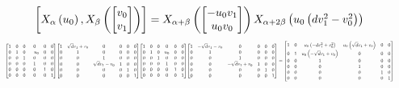 \documentclass[11pt]{article}
\theoremstyle{definition}
\begin{document}
\[
\scaletoalign{\textwidth}{\left[ X_{\alpha}\left(u_{0}\right), X_{\beta}\left(\left[\begin{matrix}v_{0}\\v_{1}\end{matrix}\right]\right) \right] = X_{\alpha + \beta}\left(\left[\begin{matrix}- u_{0} v_{1}\\u_{0} v_{0}\end{matrix}\right]\right) X_{\alpha + 2\beta}\left(u_{0} \left(d v_{1}^{2} - v_{0}^{2}\right)\right)}
\]
\[
\scaletoalign{\textwidth}{{\left[\begin{matrix}1 & 0 & 0 & 0 & 0 & 0\\0 & 1 & 0 & - u_{0} & 0 & 0\\0 & 0 & 1 & 0 & 0 & 0\\0 & 0 & 0 & 1 & 0 & 0\\0 & 0 & 0 & 0 & 1 & 0\\0 & 0 & 0 & 0 & 0 & 1\end{matrix}\right]} {\left[\begin{matrix}1 & \sqrt{d} v_{1} + v_{0} & 0 & 0 & 0 & 0\\0 & 1 & 0 & 0 & 0 & 0\\0 & 0 & 1 & 0 & 0 & 0\\0 & 0 & \sqrt{d} v_{1} - v_{0} & 1 & 0 & 0\\0 & 0 & 0 & 0 & 1 & 0\\0 & 0 & 0 & 0 & 0 & 1\end{matrix}\right]} {\left[\begin{matrix}1 & 0 & 0 & 0 & 0 & 0\\0 & 1 & 0 & u_{0} & 0 & 0\\0 & 0 & 1 & 0 & 0 & 0\\0 & 0 & 0 & 1 & 0 & 0\\0 & 0 & 0 & 0 & 1 & 0\\0 & 0 & 0 & 0 & 0 & 1\end{matrix}\right]} {\left[\begin{matrix}1 & - \sqrt{d} v_{1} - v_{0} & 0 & 0 & 0 & 0\\0 & 1 & 0 & 0 & 0 & 0\\0 & 0 & 1 & 0 & 0 & 0\\0 & 0 & - \sqrt{d} v_{1} + v_{0} & 1 & 0 & 0\\0 & 0 & 0 & 0 & 1 & 0\\0 & 0 & 0 & 0 & 0 & 1\end{matrix}\right]} = {\left[\begin{matrix}1 & 0 & u_{0} \left(- d v_{1}^{2} + v_{0}^{2}\right) & u_{0} \left(\sqrt{d} v_{1} + v_{0}\right) & 0 & 0\\0 & 1 & u_{0} \left(- \sqrt{d} v_{1} + v_{0}\right) & 0 & 0 & 0\\0 & 0 & 1 & 0 & 0 & 0\\0 & 0 & 0 & 1 & 0 & 0\\0 & 0 & 0 & 0 & 1 & 0\\0 & 0 & 0 & 0 & 0 & 1\end{matrix}\right]}}
\]
\end{document}
